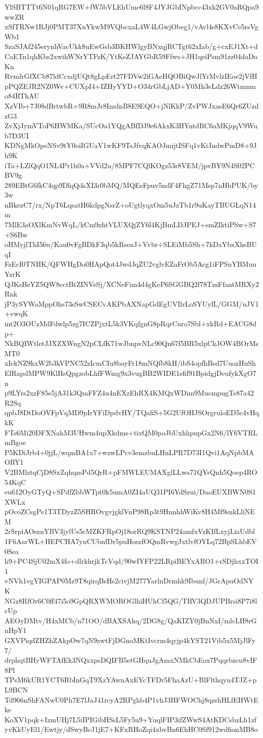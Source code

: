YlSBTTTt6N01qRG7EW+fW5bVLEhUmc6l8F4JYJGbINpbcc43xk2GV0aRQpa9wwZR
xSfTRNw1RJj0PMT37XuYkwM9VQbcxaL4W4LGwjObeg1/vAvl4s8KXvCe5rsVgWb1
SzaSJAf245erynhVacUkk8uEwGsb3BKHWlgyBNxqjRCTgt62xIab/g+cxEJ1Xt+d
CaETn1qhKbs2xwihWNrYTFzK/YtKsZJAYGbR59Ffws+JH1qeiPsm91zz04daDoKn
RvmfrGfXCb87ldCcxdjUQt8gLpErt27FDVw2iGAeHQOBiQwJlYrMvlzIEoe2jVfH
pPQZEJR2NZ0Wv+CUXpI4+IZHyYYD+O34rGbLjAD+Y0Mh3eLdz26Wtmnmo84RThAU
XzVIb+7J08dBrtwbR+9R8mJr8ImdnB8E9EQO+jNlKkP/ZvPWJxasE6Qr6ZUzdzG3
ZvXjJymVToP6HWMKa/SUcOa1YQgABfDJ9e6AkxK3HYntdRC6aMKjqqV9Wub7D3UI
KDNgMkOpeNSv9tY0oiIGUaV1wKF9TsJfvqKAOJmijtISFq1vKiJndwPmD8+9Jh9K
iTa+LZlQqO1NL4Pr1h0a+VVd2u/8MPF7CQlKOgz53r8VEM/jpvBY9N4S02PCBV9g
289EBtG6fkC4qp9DlqQdsXI3r0bMQ/MQEeFpuv5ndF4FhgZ71Msp7nHbPUK/by3w
nBkezC7/rx/NpT6LqsatH6kdpgNsrZ+oUgtlyqxOm5uJzTb1r9uKayTBUGLqN14m
7MlE3aOXlKmNvWqL/kCm9zhtVLUXQjZY6l4KjBmLDJPEJ+smZIktiPSw+S7+S6Bw
oHMyjlThI56u/Kau0vFgBDkF3qb5kRsozJ+Vvbr+SLEiMb5Sh+7kDaYbxXhsBUqI
FsEcI0TNHK/QFWHgDo0HApQot4JwdJqZU2vglvEZaFrOb5Acg1iFPSuYBMuuYzrK
QJKsBeYZ5QW8cctBtZINVeSj/XCNeFim4d4gKeP6SGGBQ2f78TmFfantMRXy2Rnk
jP3ySYWaMppOhs73sSwCSECvAKPbAXNapGdEgUVIlrLoSYUyfL/GGM/uJV1+vwqK
mt2O3OUzMdFdwlp5zg7ICZPjxtL5k3VKqfgnG8pRqrCuro7Sbl+xkRd+EACG8dp+
NkBQIWtletJJXZXWngN2pCLfK71wJbnpvNLc90Qn67f5BR5xlpCkJOW4BOrMsMT0
xIckNZ9kxW2b3kVPNC52zIcmCIu8bayFr18mNQfb8kH/ibS4opfhBsd7UuozHuSh
ElRapdMPW9KlHsQpgzobLhfFWmg9x3vugBB2WIDE1sfif91BpidgjDeufykXgO7n
p9LYrs2xzF85e5jA31k3QmFFZ4u4nEXzEhRX4KMQxWDim9MucmpugTe87a42R2Sq
qpbJ8DtDoOVFpVqMD9pIrYFiDpdvHY/TQafiS+5G2UfOHJSOrgruloED5c4vHqkK
FTs6Mi20DFXNahM3UHwm4upXkdms+tixQM0poJbUxhhpupGx2N6/lY6VTRLmBgoe
P5KDiJrb4+0jjL/wqmBA1x7+wzwLPcv3emzbuLHnLPR7D73I1Qvi1AqNpbMAORY1
V2BMlztqCjD8SxZqhqzsPd5QrR+pFMWLEUMAXglLLwa71QYrQnh5Qoep4RO54KqC
eu612OyGTyQ+SPdfZbbWTpt0k5umA0ZI4aUQ31PI6YdSzui/DaoEUXBWN0S1XWLx
pOcoZCsgPe1T3TDyzZ5SHROvgvjgklVnP98Rp3t9HnnhhWiKv8H4Mf9snkLliNEM
2rSrpiAOsznYBV3jylUs5cMZKFRpOj18orRQ9KSTNP24amfxVzKIfLxyjLiaUdbl
1F6AarWL+HEPCHA7ynCUbnfDr5puHoszfOQmRvwgJxtlvfOYLq72BpSLhbEV0Sea
h9+PC4SjU02mX4fo+dlrkhrjkTcVqd/90wIYFP22LRpiBEYxARO1+rSDjhxxTOI1
vNVh1vgYIGPAP0Mz9T8qirqBsHs2civjM277YarlnDrmhk9Ibunf/JGrApuOdNYK
NGz8RfOr6C0ff47i5o9GpQRXWMOROGlhiHUhCf5QG/TRV3QDJUPBrsi8P7i8lcUp
AEOyDMtv/H4xMCb/n71OO/dBAXSAkq/2DG8g/QaKIZY0jBnNxI/mlcLH8rGnHpY1
GXVPiqdZHZhZAkpOw7qN9zwtFjDGnoMKtIvcrm4qyjp4kYST21Vib5x5MjJlFy7/
drphqtBHyWFTAfEk3NQxxpsDQIFB5etGHquJgAmxNMkCbEox7Pqqrbzcu8vIF8Pl
TPsM6kUR1YCT6RbInGqT9XzYAwnAxEYcTFDr5FhaAzU+BlFlthqyu4TJZ+pL9BCN
Td966nShFANwU0Ph7E7lJaJ41rcyA2RPghb4P1vhJ3HFWOChj8qzshHLfEHWtEke
KoXV1pqk+IzmUHj7L5iIPIGibHSsL5Fy5u9+YuqlFIP3ifZWwS4AtKDCsbzLh1zf
yvKkUyEl1/Ewtjy/dSwyBcJ1jE7+KFxRHoZqi4xbvBn6EhHC0Sf912wdfionMB8o
